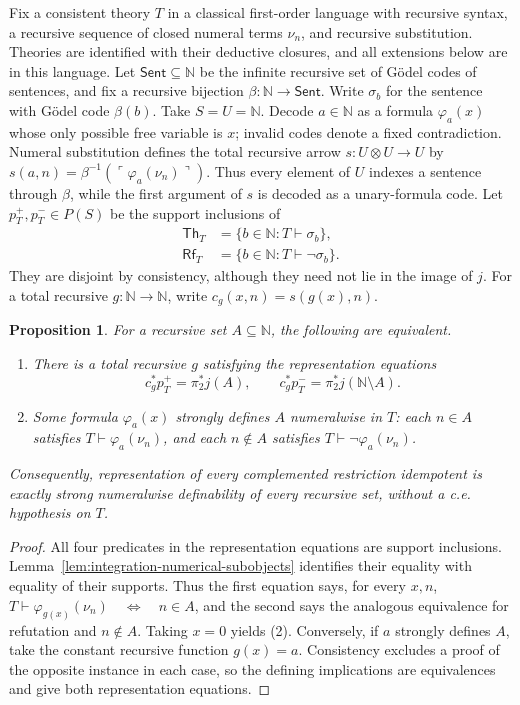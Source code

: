 \documentclass[11pt]{article}
\newtheorem{proposition}[theorem]{Proposition}
\theoremstyle{definition}
\theoremstyle{remark}
\begin{document}
Fix a consistent theory $T$ in a classical first-order language
with recursive syntax, a recursive sequence of closed numeral terms
$\nu_n$, and recursive substitution. Theories are identified
with their deductive closures, and all extensions below are in
this language. Let $\mathsf{Sent}\subseteq\mathbb N$ be the infinite
recursive set of G\"odel codes of sentences, and fix a recursive
bijection $\beta:\mathbb N\to\mathsf{Sent}$. Write $\sigma_b$
for the sentence with G\"odel code $\beta(b)$. Take $S=U=\mathbb N$.
Decode $a\in\mathbb N$ as a formula $\varphi_a(x)$
whose only possible free variable is $x$; invalid codes denote a
fixed contradiction. Numeral substitution defines the total
recursive arrow $s:U\otimes U\to U$ by
$s(a,n)=\beta^{-1}(\ulcorner\varphi_a(\nu_n)\urcorner)$.
Thus every element of $U$ indexes a sentence through $\beta$,
while the first argument of $s$ is decoded as a unary-formula code.
Let $p_T^+,p_T^-\in P(S)$ be the support inclusions of
\begin{align*}
 \mathsf{Th}_T&=\{b\in\mathbb N:T\vdash\sigma_b\},\\
 \mathsf{Rf}_T&=\{b\in\mathbb N:T\vdash\neg\sigma_b\}.
\end{align*}
They are disjoint by consistency, although they need not lie in
the image of $j$. For a total recursive $g:\mathbb N\to\mathbb N$,
write $c_g(x,n)=s(g(x),n)$.

\begin{proposition}\label{prop:integration-arbitrary-adequacy}
For a recursive set $A\subseteq\mathbb N$, the following are
equivalent.
\begin{enumerate}
\item There is a total recursive $g$ satisfying the representation equations
\[
 c_g^*p_T^+=\pi_2^*j(A),\qquad
 c_g^*p_T^-=\pi_2^*j(\mathbb N\setminus A).
\]
\item Some formula $\varphi_a(x)$ strongly defines $A$
numeralwise in $T$: each $n\in A$ satisfies
$T\vdash\varphi_a(\nu_n)$, and each $n\notin A$ satisfies
$T\vdash\neg\varphi_a(\nu_n)$.
\end{enumerate}
Consequently, representation of every complemented restriction idempotent is exactly strong numeralwise definability
of every recursive set, without a c.e. hypothesis on $T$.
\end{proposition}
\begin{proof}
All four predicates in the representation equations are support inclusions.
Lemma~\ref{lem:integration-numerical-subobjects} identifies their
equality with equality of their supports. Thus the first equation says, for every $x,n$,
$T\vdash\varphi_{g(x)}(\nu_n)\quad\Longleftrightarrow\quad n\in A$,
and the second says the analogous equivalence for refutation and
$n\notin A$. Taking $x=0$ yields (2). Conversely, if $a$
strongly defines $A$, take the constant recursive function
$g(x)=a$. Consistency excludes a proof of the opposite instance
in each case, so the defining implications are equivalences and
give both representation equations.
\end{proof}
\end{document}
